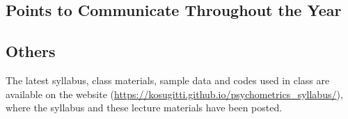 \subsection*{Points to Communicate Throughout the Year}


\subsection*{Others}
The latest syllabus, class materials, sample data and codes used in class are available on the website (\url{https://kosugitti.github.io/psychometrics_syllabus/}), where the syllabus and these lecture materials have been posted.
